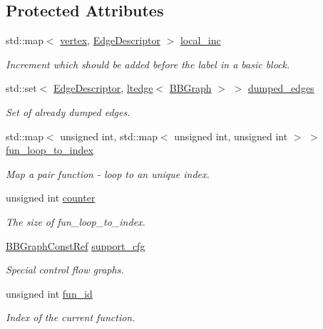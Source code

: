 \subsection*{Protected Attributes}
\begin{DoxyCompactItemize}
\item 
std\+::map$<$ \hyperlink{graph_8hpp_abefdcf0544e601805af44eca032cca14}{vertex}, \hyperlink{graph_8hpp_a9eb9afea34e09f484b21f2efd263dd48}{Edge\+Descriptor} $>$ \hyperlink{classEdgeCWriter_a7b417f4e7cc68c365e804828f5ced098}{local\+\_\+inc}
\begin{DoxyCompactList}\small\item\em Increment which should be added before the label in a basic block. \end{DoxyCompactList}\item 
std\+::set$<$ \hyperlink{graph_8hpp_a9eb9afea34e09f484b21f2efd263dd48}{Edge\+Descriptor}, \hyperlink{structltedge}{ltedge}$<$ \hyperlink{structBBGraph}{B\+B\+Graph} $>$ $>$ \hyperlink{classEdgeCWriter_a8253f69d8bed3c2e26a00ecc16955c16}{dumped\+\_\+edges}
\begin{DoxyCompactList}\small\item\em Set of already dumped edges. \end{DoxyCompactList}\item 
std\+::map$<$ unsigned int, std\+::map$<$ unsigned int, unsigned int $>$ $>$ \hyperlink{classEdgeCWriter_aae33614ac66605c84a7ccc1552af424f}{fun\+\_\+loop\+\_\+to\+\_\+index}
\begin{DoxyCompactList}\small\item\em Map a pair function -\/ loop to an unique index. \end{DoxyCompactList}\item 
unsigned int \hyperlink{classEdgeCWriter_a49c0cee264f99741c51a888c52a4e429}{counter}
\begin{DoxyCompactList}\small\item\em The size of fun\+\_\+loop\+\_\+to\+\_\+index. \end{DoxyCompactList}\item 
\hyperlink{basic__block_8hpp_ab66bdbde3a29e41d079d8a320af9c921}{B\+B\+Graph\+Const\+Ref} \hyperlink{classEdgeCWriter_ab394651b6c31ee7b0dbd7552d506dfd3}{support\+\_\+cfg}
\begin{DoxyCompactList}\small\item\em Special control flow graphs. \end{DoxyCompactList}\item 
unsigned int \hyperlink{classEdgeCWriter_a24e5a49302d7900304d7c020889aa979}{fun\+\_\+id}
\begin{DoxyCompactList}\small\item\em Index of the current function. \end{DoxyCompactList}\end{DoxyCompactItemize}
